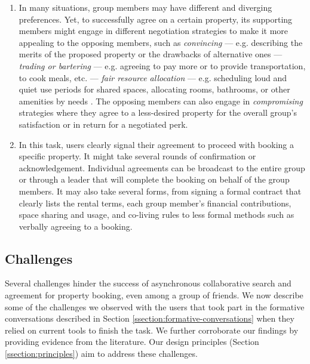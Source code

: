 \begin{enumerate}[label={}, leftmargin=0cm, itemindent=0.2cm]
\item \tNegotiation  In many situations, group members may have different and diverging preferences. Yet, to successfully agree on a certain property, its supporting members might engage in different negotiation strategies to make it more appealing to the opposing members, such as  \textit{convincing} --- e.g. describing the merits of the proposed property or the drawbacks of alternative ones \cite{meetingmediator} --- 
    \textit{trading or bartering} --- e.g. agreeing to pay more or to provide transportation, to cook meals, etc. \cite{pocketnegotiator} --- 
    \textit{fair resource allocation} --- e.g. scheduling loud and quiet use periods for shared spaces, allocating rooms, bathrooms, or other amenities by needs \cite{fairresourceallocation}. 
    The opposing members can also engage in \textit{compromising} strategies where they agree to a less-desired property for the overall group's satisfaction or in return for a negotiated perk.

\item \tAgreement  In this task, users clearly signal their agreement to proceed with booking a specific property. It might take several rounds of confirmation or acknowledgement. Individual agreements can be broadcast to the entire group or through a leader that will complete the booking on behalf of the group members. It may also take several forms, from signing a formal contract that clearly lists the rental terms, each group member's financial contributions, space sharing and usage, and co-living rules to less formal methods such as verbally agreeing to a booking.

\end{enumerate}

\subsection {Challenges}
\label{ssection:challenges}

Several challenges hinder the success of asynchronous collaborative search and agreement for property booking, even among a group of friends. We now describe some of the challenges we observed with the users that took part in the formative conversations described in Section \ref{ssection:formative-conversations} when they relied on current tools to finish the task. We further corroborate our findings by providing evidence from the literature. Our design principles (Section \ref{ssection:principles}) aim to address these challenges.

